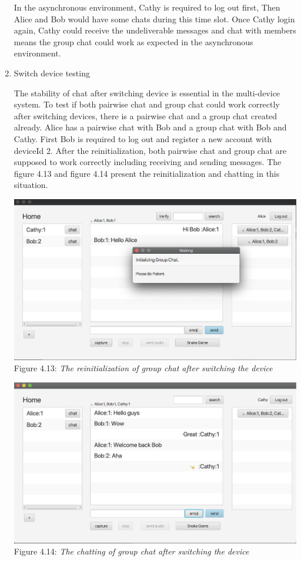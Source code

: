 \begin{enumerate}[label=(\roman*)]
In the asynchronous environment, Cathy is required to log out first, Then Alice and Bob would have some chats during this time slot. Once Cathy login again, Cathy could receive the undeliverable messages and chat with members means the group chat could work as expected in the asynchronous environment.

\item Switch device testing

The stability of chat after switching device is essential in the multi-device system. To test if both pairwise chat and group chat could work correctly after switching devices, there is a pairwise chat and a group chat created already. Alice has a pairwise chat with Bob and a group chat with Bob and Cathy. First Bob is required to log out and register a new account with deviceId 2. After the reinitialization, both pairwise chat and group chat are supposed to work correctly including receiving and sending messages. The figure 4.13 and figure 4.14 present the reinitialization and chatting in this situation.

\begin{center}
\includegraphics[scale=.45]{../4-Implementation/resources/group-init-re.png}\\
Figure 4.13: \textit{The reinitialization of group chat after switching the device}
\end{center}

\begin{center}
\includegraphics[scale=.45]{../4-Implementation/resources/group-chat-re.png}\\
Figure 4.14: \textit{The chatting of group chat after switching the device}
\end{center}


\end{enumerate}
